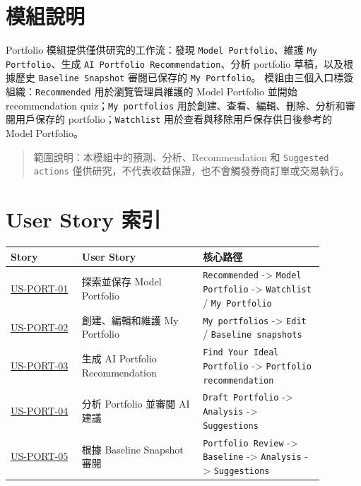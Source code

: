 \section{模組說明}
Portfolio 模組提供僅供研究的工作流：發現 \texttt{Model Portfolio}、維護 \texttt{My Portfolio}、生成 \texttt{AI Portfolio Recommendation}、分析 portfolio 草稿，以及根據歷史 \texttt{Baseline Snapshot} 審閱已保存的 \texttt{My Portfolio}。
模組由三個入口標簽組織：\texttt{Recommended} 用於瀏覽管理員維護的 Model Portfolio 並開始 recommendation quiz；\texttt{My portfolios} 用於創建、查看、編輯、刪除、分析和審閱用戶保存的 portfolio；\texttt{Watchlist} 用於查看與移除用戶保存供日後參考的 Model Portfolio。
\begin{quote}\small 範圍說明：本模組中的預測、分析、Recommendation 和 \texttt{Suggested actions} 僅供研究，不代表收益保證，也不會觸發券商訂單或交易執行。\end{quote}
\section{User Story 索引}
\begingroup
\small
\begin{longtable}{L{0.20\linewidth}L{0.34\linewidth}L{0.34\linewidth}}
\toprule
\textbf{Story} & \textbf{User Story} & \textbf{核心路徑} \\
\midrule
\hyperlink{us-port-01}{US-PORT-01} & 探索並保存 Model Portfolio & \texttt{Recommended} -\textgreater{} \texttt{Model Portfolio} -\textgreater{} \texttt{Watchlist} /\allowbreak{} \texttt{My Portfolio} \\
\hyperlink{us-port-02}{US-PORT-02} & 創建、編輯和維護 My Portfolio & \texttt{My portfolios} -\textgreater{} \texttt{Edit} /\allowbreak{} \texttt{Baseline snapshots} \\
\hyperlink{us-port-03}{US-PORT-03} & 生成 AI Portfolio Recommendation & \texttt{Find Your Ideal Portfolio} -\textgreater{} \texttt{Portfolio recommendation} \\
\hyperlink{us-port-04}{US-PORT-04} & 分析 Portfolio 並審閱 AI 建議 & \texttt{Draft Portfolio} -\textgreater{} \texttt{Analysis} -\textgreater{} \texttt{Suggestions} \\
\hyperlink{us-port-05}{US-PORT-05} & 根據 Baseline Snapshot 審閱 & \texttt{Portfolio Review} -\textgreater{} \texttt{Baseline} -\textgreater{} \texttt{Analysis} -\textgreater{} \texttt{Suggestions} \\
\bottomrule
\end{longtable}
\endgroup
